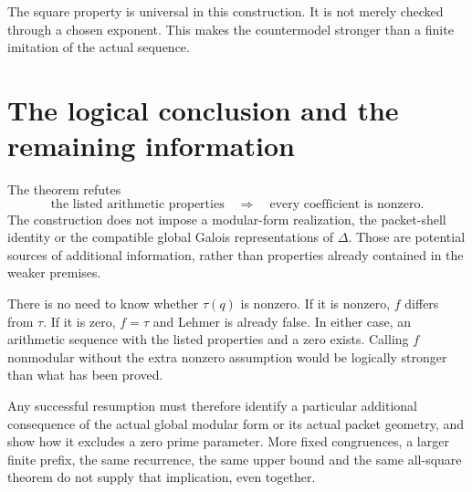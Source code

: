The square property is universal in this construction. It is not merely checked through a chosen exponent. This makes the countermodel stronger than a finite imitation of the actual sequence.

\section{The logical conclusion and the remaining information}
The theorem refutes
\[
\text{the listed arithmetic properties}\quad\Longrightarrow\quad
\text{every coefficient is nonzero}.
\]
The construction does not impose a modular-form realization, the packet-shell identity or the compatible global Galois representations of $\Delta$. Those are potential sources of additional information, rather than properties already contained in the weaker premises.

There is no need to know whether $\tau(q)$ is nonzero. If it is nonzero, $f$ differs from $\tau$. If it is zero, $f=\tau$ and Lehmer is already false. In either case, an arithmetic sequence with the listed properties and a zero exists. Calling $f$ nonmodular without the extra nonzero assumption would be logically stronger than what has been proved.

Any successful resumption must therefore identify a particular additional consequence of the actual global modular form or its actual packet geometry, and show how it excludes a zero prime parameter. More fixed congruences, a larger finite prefix, the same recurrence, the same upper bound and the same all-square theorem do not supply that implication, even together.
